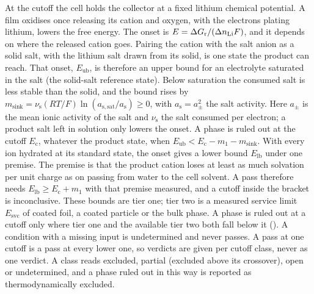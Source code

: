 At the cutoff the cell holds the collector at a fixed lithium chemical potential. %
A film oxidises once releasing its cation and oxygen, with the electrons plating lithium, lowers the free energy. %
The onset is $E=\Delta G_\mathrm{r}/(\Delta n_\mathrm{Li}F)$, and it depends on where the released cation goes. %
Pairing the cation with the salt anion as a solid salt, with the lithium salt drawn from its solid, is one state the product can reach. %
That onset, $E_\mathrm{ub}$, is therefore an upper bound for an electrolyte saturated in the salt (the solid-salt reference state). %
Below saturation the consumed salt is less stable than the solid, and the bound rises by $m_\mathrm{sink}=\nu_\mathrm{s}(RT/F)\ln(a_\mathrm{s,sat}/a_\mathrm{s})\ge0$, with $a_\mathrm{s}=a_\pm^2$ the salt activity. %
Here $a_\pm$ is the mean ionic activity of the salt and $\nu_\mathrm{s}$ the salt consumed per electron; a product salt left in solution only lowers the onset. %
A phase is ruled out at the cutoff $E_\mathrm{c}$, whatever the product state, when $E_\mathrm{ub}<E_\mathrm{c}-m_1-m_\mathrm{sink}$. %
With every ion hydrated at its standard state, the onset gives a lower bound $E_\mathrm{lb}$ under one premise. %
The premise is that the product cation loses at least as much solvation per unit charge as  on passing from water to the cell solvent. %
A pass therefore needs $E_\mathrm{lb}\ge E_\mathrm{c}+m_1$ with that premise measured, and a cutoff inside the bracket is inconclusive. %
These bounds are tier one; tier two is a measured service limit $E_\mathrm{svc}$ of coated foil, a coated particle or the bulk phase. %
A phase is ruled out at a cutoff only where tier one and the available tier two both fall below it (). %
A condition with a missing input is undetermined and never passes. %
A pass at one cutoff is a pass at every lower one, so verdicts are given per cutoff class, never as one verdict. %
A class reads excluded, partial (excluded above its crossover), open or undetermined, and a phase ruled out in this way is reported as thermodynamically excluded\nacreExcludedMark. %


